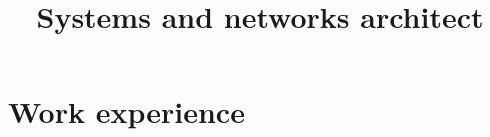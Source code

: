 \documentclass[12pt,a4paper,roman]{moderncv}          %
\title{Systems and networks architect}
\begin{document}
\makecvtitle


\section{Work experience}


\end{document}
